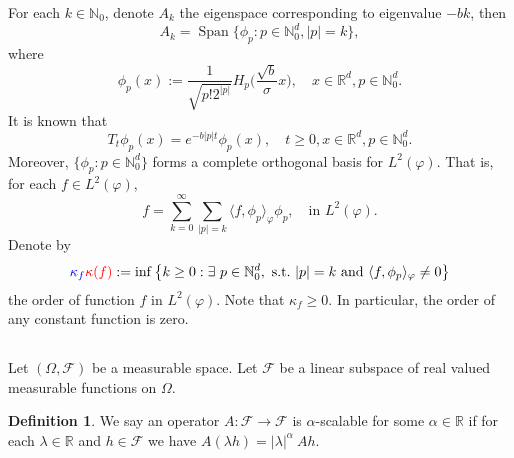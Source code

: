 \documentclass[12pt,oneside,english]{amsart}
\theoremstyle{plain}
\theoremstyle{definition}
\newtheorem{defi}[thm]{Definition}
\numberwithin{equation}{section}
\newcommand{\added}[1]{{\color{blue}#1}}\newcommand{\deleted}[1]{{\color{red}#1}}
\begin{document}
    For each $k \in \mathbb N_0$, denote $A_k$ the eigenspace corresponding to eigenvalue $-bk$, then
\begin{equation}
    A_k
    = \operatorname{Span} \{\phi_p : p\in \mathbb N_0^d, |p|=k\},
\end{equation}
where
\begin{equation}\label{eigenfunction}
    \phi_p(x)
    := \frac{1}{\sqrt{ p! 2^{|p|} }} H_p \Big(\frac{ \sqrt{b} }{\sigma}x \Big),
    \quad x\in \mathbb{R}^d, p\in \mathbb N_0^d.
\end{equation}
    It is known that
\begin{equation}\label{semigroupformula}
    T_t\phi_p(x)
    =e^{-b|p|t}\phi_p(x),
    \quad t\geq 0, x\in \mathbb{R}^d, p\in \mathbb N_0^d.
\end{equation}
    Moreover, $\{\phi_p: p \in \mathbb N_0^d\}$ forms a complete orthogonal basis for $L^2(\varphi)$.
    That is, for each $f\in L^2(\varphi)$,
\begin{equation}\label{semicomp1}
    f
    =\sum_{k=0}^{\infty}\sum_{|p|=k}\langle f, \phi_p \rangle_{\varphi} \phi_p,
    \quad \text{in~} L^2(\varphi).
\end{equation}
    Denote by
\begin{equation}\label{order}
    \added{\kappa_f}\deleted{\kappa(f)}
    :=\inf \left \{k\geq 0: \exists ~ p\in \mathbb N_0^d ,{\rm ~s.t.~}|p|=k {\rm ~and~}  \langle f, \phi_p \rangle_{\varphi}\neq 0\right \}
\end{equation}
    the order of function $f$ in $L^2(\varphi)$.
    Note that $ \kappa_f\geq 0$.
    In particular, the order of any constant function is zero.

\subsection{}
    Let $(\Omega, \mathscr F)$ be a measurable space.
    Let $\mathcal F$ be a linear subspace of real valued measurable functions on $\Omega$.
\begin{defi}
\label{def: alpha-positive operator}
    We say an operator $A: \mathcal F \to \mathcal F$ is $\alpha$-scalable for some $\alpha \in \mathbb R$ if for each $\lambda \in \mathbb R$ and $h \in \mathcal F$ we have $A (\lambda h) = |\lambda|^\alpha~ Ah$.
\end{defi}
\end{document}
